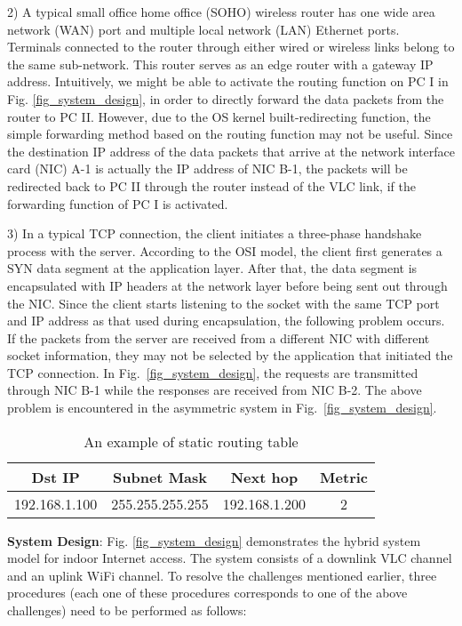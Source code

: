 \documentclass[10pt,journal]{IEEEtran}
\begin{document}
2) A typical small office home office (SOHO) wireless router has one wide area network (WAN) port and multiple local network (LAN) Ethernet ports. Terminals connected to the router through either wired or wireless links belong to the same sub-network. This router serves as an edge router with a gateway IP address. Intuitively, we might be able to activate the routing function on PC I in Fig. \ref{fig_system_design}, in order to directly forward the data packets from the router to PC II. However, due to the OS kernel built-redirecting function, the simple forwarding method based on the routing function may not be useful. Since the destination IP address of the data packets that arrive at the network interface card (NIC) A-1 is actually the IP address of NIC B-1, the packets will be redirected back to PC II through the router instead of the VLC link, if the forwarding function of PC I is activated.

3) In a typical TCP connection, the client initiates a three-phase handshake process with the server. According to the OSI model, the client first generates a SYN data segment at the application layer. After that, the data segment is encapsulated with IP headers at the network layer before being sent out through the NIC. Since the client starts listening to the socket with the same TCP port and IP address as that used during encapsulation, the following problem occurs. If the packets from the server are received from a different NIC with different socket information, they may not be selected by the application that initiated the TCP connection. In Fig.~\ref{fig_system_design}, the requests are transmitted through NIC B-1 while the responses are received from NIC B-2. The above problem is encountered in the asymmetric system in Fig.~\ref{fig_system_design}.

\begin{table}
\centering
\caption{An example of static routing table}
\begin{tabular}{|c|c|c|c|} \hline
Dst IP&Subnet Mask&Next hop&Metric\\ \hline
192.168.1.100&255.255.255.255&192.168.1.200&2\\ \hline
\end{tabular}
\end{table}

\textbf{System Design}: Fig. \ref{fig_system_design} demonstrates the hybrid system model for indoor Internet access. The system consists of a downlink VLC channel and an uplink WiFi channel. To resolve the challenges mentioned earlier, three procedures (each one of these procedures corresponds to one of the above challenges) need to be performed as follows:
\end{document}
